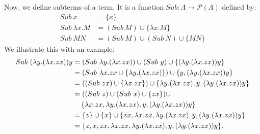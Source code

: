 \documentclass[a4paper, openany]{memoir}
\theoremstyle{definition}
\begin{document}
    Now, we define subterms of a term. It is a function $Sub \colon \Lambda \to \mathcal{P}(\Lambda)$ defined by:
    \begin{align*}
        Sub \ x &= \{x\} \\
        Sub \ \lambda x. M &= (Sub \ M) \cup \{\lambda x. M\} \\
        Sub \ MN &= (Sub \ M) \cup (Sub \ N) \cup \{MN\}
    \end{align*}
    We illustrate this with an example:
    \begin{align*}
        Sub \ (\lambda y. (\lambda x. zx)) y &= (Sub \ \lambda y. (\lambda x. zx)) \cup (Sub \ y) \cup \{(\lambda y. (\lambda x. zx)) y\} \\
        &= (Sub \ \lambda x. zx \cup \{\lambda y. (\lambda x. zx)\}) \cup \{y, (\lambda y. (\lambda x. zx)) y\} \\
        &= ((Sub \ zx) \cup \{\lambda x. zx\}) \cup \{\lambda y. (\lambda x. zx), y, (\lambda y. (\lambda x. zx)) y\} \\
        &= ((Sub \ z) \cup (Sub \ x) \cup \{zx\}) \cup \\
        &\hspace*{12pt} \{\lambda x. zx, \lambda y. (\lambda x. zx), y, (\lambda y. (\lambda x. zx)) y\} \\
        &= \{z\} \cup \{x\} \cup \{zx, \lambda x. zx, \lambda y. (\lambda x. zx), y, (\lambda y. (\lambda x. zx)) y\}  \\
        &= \{z, x, zx, \lambda x. zx, \lambda y. (\lambda x. zx), y, (\lambda y. (\lambda x. zx)) y\}.
    \end{align*}
\end{document}
